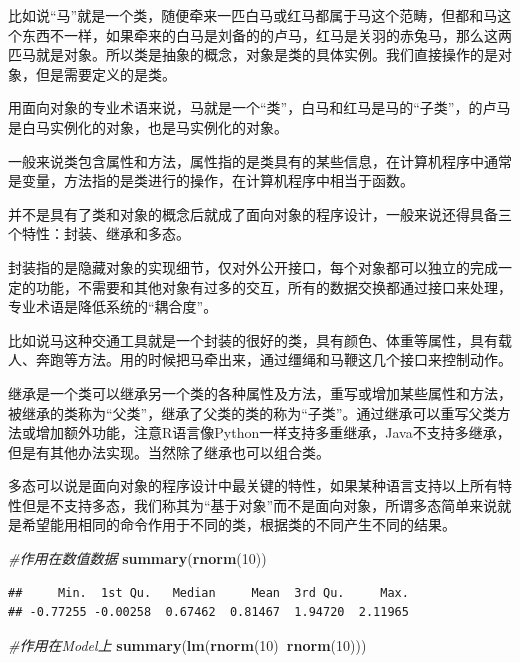\documentclass[]{book}
\newenvironment{Shaded}{\begin{snugshade}}{\end{snugshade}}
\newcommand{\KeywordTok}[1]{\textcolor[rgb]{0.13,0.29,0.53}{\textbf{#1}}}
\newcommand{\DecValTok}[1]{\textcolor[rgb]{0.00,0.00,0.81}{#1}}
\newcommand{\CommentTok}[1]{\textcolor[rgb]{0.56,0.35,0.01}{\textit{#1}}}
\newcommand{\OperatorTok}[1]{\textcolor[rgb]{0.81,0.36,0.00}{\textbf{#1}}}
\newcommand{\NormalTok}[1]{#1}
\begin{document}
比如说``马''就是一个类，随便牵来一匹白马或红马都属于马这个范畴，但都和马这个东西不一样，如果牵来的白马是刘备的的卢马，红马是关羽的赤兔马，那么这两匹马就是对象。所以类是抽象的概念，对象是类的具体实例。我们直接操作的是对象，但是需要定义的是类。

用面向对象的专业术语来说，马就是一个``类''，白马和红马是马的``子类''，的卢马是白马实例化的对象，也是马实例化的对象。

一般来说类包含属性和方法，属性指的是类具有的某些信息，在计算机程序中通常是变量，方法指的是类进行的操作，在计算机程序中相当于函数。

并不是具有了类和对象的概念后就成了面向对象的程序设计，一般来说还得具备三个特性：封装、继承和多态。

封装指的是隐藏对象的实现细节，仅对外公开接口，每个对象都可以独立的完成一定的功能，不需要和其他对象有过多的交互，所有的数据交换都通过接口来处理，专业术语是降低系统的``耦合度''。

比如说马这种交通工具就是一个封装的很好的类，具有颜色、体重等属性，具有载人、奔跑等方法。用的时候把马牵出来，通过缰绳和马鞭这几个接口来控制动作。

继承是一个类可以继承另一个类的各种属性及方法，重写或增加某些属性和方法，被继承的类称为``父类''，继承了父类的类的称为``子类''。通过继承可以重写父类方法或增加额外功能，注意R语言像Python一样支持多重继承，Java不支持多继承，但是有其他办法实现。当然除了继承也可以组合类。

多态可以说是面向对象的程序设计中最关键的特性，如果某种语言支持以上所有特性但是不支持多态，我们称其为``基于对象''而不是面向对象，所谓多态简单来说就是希望能用相同的命令作用于不同的类，根据类的不同产生不同的结果。

\begin{Shaded}
\begin{Highlighting}[]
\CommentTok{#作用在数值数据}
\KeywordTok{summary}\NormalTok{(}\KeywordTok{rnorm}\NormalTok{(}\DecValTok{10}\NormalTok{))}
\end{Highlighting}
\end{Shaded}

\begin{verbatim}
##     Min.  1st Qu.   Median     Mean  3rd Qu.     Max. 
## -0.77255 -0.00258  0.67462  0.81467  1.94720  2.11965
\end{verbatim}

\begin{Shaded}
\begin{Highlighting}[]
\CommentTok{#作用在Model上}
\KeywordTok{summary}\NormalTok{(}\KeywordTok{lm}\NormalTok{(}\KeywordTok{rnorm}\NormalTok{(}\DecValTok{10}\NormalTok{)}\OperatorTok{~}\KeywordTok{rnorm}\NormalTok{(}\DecValTok{10}\NormalTok{)))}
\end{Highlighting}
\end{Shaded}
\end{document}
